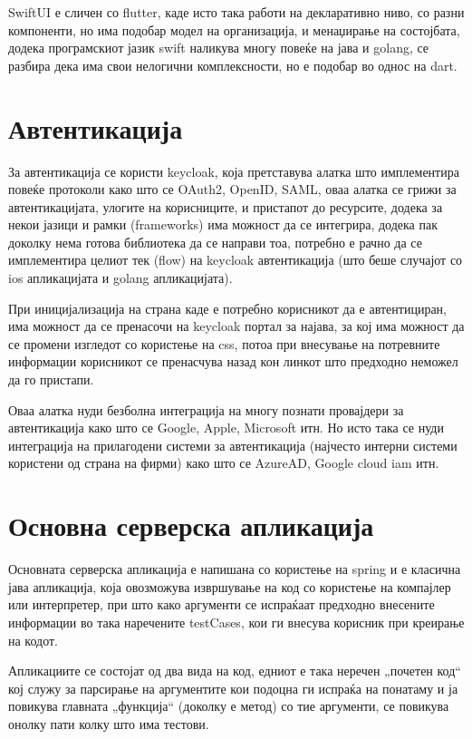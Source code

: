 \documentclass{article}
\begin{document}
SwiftUI е сличен со flutter, каде исто така работи на декларативно ниво, со разни компоненти, но има подобар модел на организација, и менаџирање на состојбата, додека програмскиот јазик swift наликува многу повеќе на јава и golang, се разбира дека има свои нелогични комплексности, но е подобар во однос на dart.

\section{Автентикација}

За автентикација се користи keycloak, која претставува алатка што имплементира повеќе протоколи како што се OAuth2, OpenID, SAML, оваа алатка се грижи за автентикацијата, улогите на корисниците, и пристапот до ресурсите, додека за некои јазици и рамки (frameworks) има можност да се интегрира, додека пак доколку нема готова библиотека да се направи тоа, потребно е рачно да се имплементира целиот тек (flow) на keycloak автентикација (што беше случајот со ios апликацијата и golang апликацијата).

При иницијализација на страна каде е потребно корисникот да е автентициран, има можност да се пренасочи на keycloak портал за најава, за кој има можност да се промени изгледот со користење на css, потоа при внесување на потревните информации корисникот се пренасчува назад кон линкот што предходно неможел да го пристапи.

Оваа алатка нуди безболна интеграција на многу познати провајдери за автентикација како што се Google, Apple, Microsoft итн. Но исто така се нуди интеграција на прилагодени системи за автентикација (најчесто интерни системи користени од страна на фирми) како што се AzureAD, Google cloud iam итн.

\section{Основна серверска апликација}

Основната серверска апликација е напишана со користење на spring и е класична јава апликација, која овозможува извршување на код со користење на компајлер или интерпретер, при што како аргументи се испраќаат предходно внесените информации во така наречените testCases, кои ги внесува корисник при креирање на кодот.

Апликациите се состојат од два вида на код, едниот е така неречен „почетен код“ кој служу за парсирање на аргументите кои подоцна ги испраќа на понатаму и ја повикува главната „функција“ (доколку е метод) со тие аргументи, се повикува онолку пати колку што има тестови.
\end{document}
